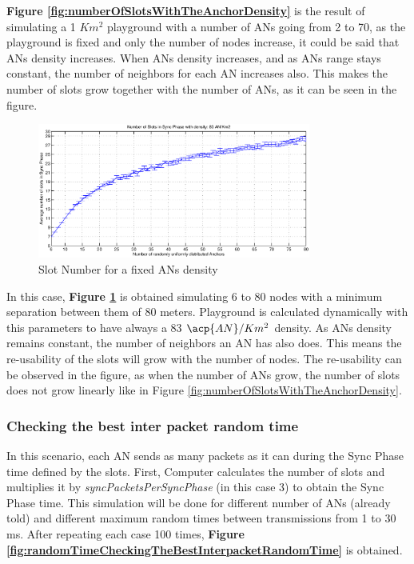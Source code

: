 \textbf{Figure \ref{fig:numberOfSlotsWithTheAnchorDensity}} is the result of simulating a 1 $Km^2$ playground with a number of \acp{AN} going from 
2 to 70, as the playground is fixed and only the number of nodes increase, it could be said that \acp{AN} density increases. When \acp{AN} density 
increases, and as \acp{AN} range stays constant, the number of neighbors for each \ac{AN} increases also. This makes the number of slots grow together
with the number of \acp{AN}, as it can be seen in the figure.

\begin{figure}[ht]
 \begin{center}
  \includegraphics[width=0.8\textwidth]{numberOfSlotsWithTheSameDensity.eps}
 \end{center}
 \caption{Slot Number for a fixed \acp{AN} density}
 \label{fig:numberOfSlotsWithTheSameDensity}
\end{figure}

In this case, \textbf{Figure \ref{fig:numberOfSlotsWithTheSameDensity}} is obtained simulating 6 to 80 nodes with a minimum separation between them of 
80 meters. Playground is calculated dynamically with this parameters to have always a 83 $\acp{AN}/Km^2$ density. As \acp{AN} density remains constant,
the number of neighbors an \ac{AN} has also does. This means the re-usability of the slots will grow with the number of nodes. The re-usability can be
observed in the figure, as when the number of \acp{AN} grow, the number of slots does not grow linearly like in Figure 
\ref{fig:numberOfSlotsWithTheAnchorDensity}.

\subsubsection{Checking the best inter packet random time}

In this scenario, each \ac{AN} sends as many packets as it can during the Sync Phase time defined by the slots. First, Computer calculates the number of
slots and multiplies it by \textit{syncPacketsPerSyncPhase} (in this case 3) to obtain the Sync Phase time. This simulation will be done for different
number of \acp{AN} (already told) and different maximum random times between transmissions from 1 to 30 ms. After repeating each case 100 times,
\textbf{Figure \ref{fig:randomTimeCheckingTheBestInterpacketRandomTime}} is obtained.

